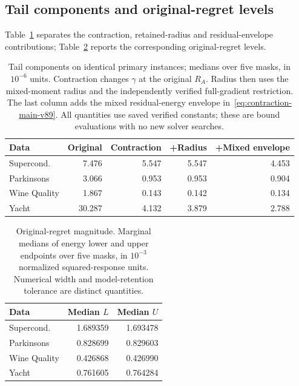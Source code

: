 \subsection{Tail components and original-regret levels}
Table~\ref{tab:tail-components-v89} separates the contraction, retained-radius and residual-envelope contributions; Table~\ref{tab:regret-levels-v89} reports the corresponding original-regret levels.
\begin{table}[t]\centering\small
\caption{Tail components on identical primary instances; medians over five masks, in $10^{-6}$ units. Contraction changes $\gamma$ at the original $R_A$. Radius then uses the mixed-moment radius and the independently verified full-gradient restriction. The last column adds the mixed residual-energy envelope in~\eqref{eq:contraction-main-v89}. All quantities use saved verified constants; these are bound evaluations with no new solver searches.}
\label{tab:tail-components-v89}
\begin{tabular}{lrrrr}\toprule
Data&Original&Contraction&+Radius&+Mixed envelope\\\midrule
Supercond. & 7.476 & 5.547 & 5.547 & 4.453\\
Parkinsons & 3.066 & 0.953 & 0.953 & 0.904\\
Wine Quality & 1.867 & 0.143 & 0.142 & 0.134\\
Yacht & 30.287 & 4.132 & 3.879 & 2.788\\
\bottomrule\end{tabular}\end{table}
\begin{table}[t]\centering\small
\caption{Original-regret magnitude. Marginal medians of energy lower and upper endpoints over five masks, in $10^{-3}$ normalized squared-response units. Numerical width and model-retention tolerance are distinct quantities.}
\label{tab:regret-levels-v89}
\begin{tabular}{lrr}\toprule Data&Median $L$&Median $U$\\\midrule
Supercond. & 1.689359 & 1.693478\\
Parkinsons & 0.828699 & 0.829603\\
Wine Quality & 0.426868 & 0.426990\\
Yacht & 0.761605 & 0.764284\\
\bottomrule\end{tabular}\end{table}
